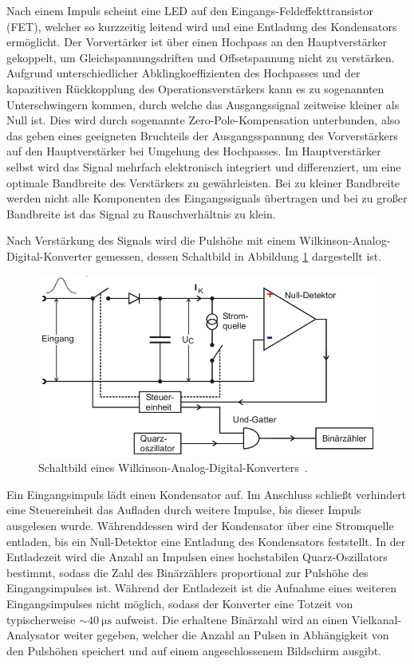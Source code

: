 Nach einem Impuls scheint eine LED auf den Eingangs-Feldeffekttransistor (FET), welcher so kurzzeitig
leitend wird und eine Entladung des Kondensators ermöglicht.
Der Vorvertärker ist über einen Hochpass an den Hauptverstärker gekoppelt, um Gleichspannungsdriften
und Offsetspannung nicht zu verstärken. Aufgrund unterschiedlicher Abklingkoeffizienten des
Hochpasses und der kapazitiven Rückkopplung des Operationsverstärkers kann es zu sogenannten
Unterschwingern kommen, durch welche das Ausgangssignal zeitweise kleiner als Null ist. Dies
wird durch sogenannte Zero-Pole-Kompensation unterbunden, also das geben eines geeigneten
Bruchteils der Ausgangsspannung des Vorverstärkers auf den Hauptverstärker bei Umgehung
des Hochpasses.
Im Hauptverstärker selbst wird das Signal mehrfach elektronisch integriert und differenziert,
um eine optimale Bandbreite des Verstärkers zu gewährleisten. Bei zu kleiner Bandbreite
werden nicht alle Komponenten des Eingangssignals übertragen und bei zu großer Bandbreite
ist das Signal zu Rauschverhältnis zu klein.

Nach Verstärkung des Signals wird die Pulshöhe mit einem Wilkinson-Analog-Digital-Konverter
gemessen, dessen Schaltbild in Abbildung \ref{fig:Wilkinson-Analog-Digital-Konverter} dargestellt ist.
\begin{figure}
	\centering
	\includegraphics[width=.8\textwidth]{images/Wilkinson-AD-Konverter.pdf}
	\caption{Schaltbild eines Wilkinson-Analog-Digital-Konverters~\cite[21]{anleitung}.}
	\label{fig:Wilkinson-Analog-Digital-Konverter}
\end{figure}
Ein Eingangsimpuls lädt einen Kondensator auf. Im Anschluss schließt verhindert eine Steuereinheit
das Aufladen durch weitere Impulse, bis dieser Impuls ausgelesen wurde.
Währenddessen wird der Kondensator über eine Stromquelle entladen, bis ein Null-Detektor eine
Entladung des Kondensators feststellt. In der Entladezeit wird die Anzahl an Impulsen eines
hochstabilen Quarz-Oszillators bestimmt, sodass die Zahl des Binärzählers proportional zur
Pulshöhe des Eingangsimpulses ist.
Während der Entladezeit ist die Aufnahme eines weiteren Eingangsimpulses nicht möglich,
sodass der Konverter eine Totzeit von typischerweise $\sim \SI{40}{\micro\second}$ aufweist.
Die erhaltene Binärzahl wird an einen Vielkanal-Analysator weiter gegeben, welcher
die Anzahl an Pulsen in Abhängigkeit von den Pulshöhen speichert und auf einem angeschlossenem
Bildschirm ausgibt.

